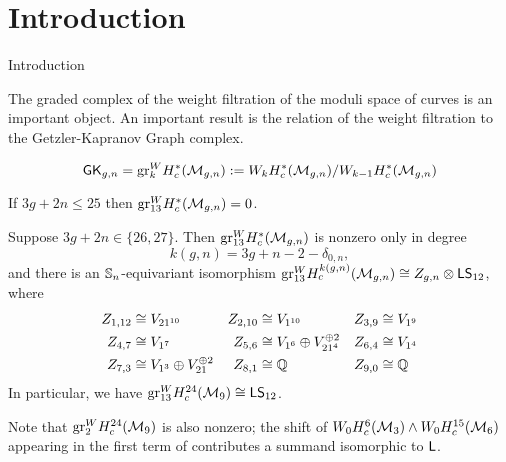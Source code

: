 



\section{Introduction}

Introduction


The graded complex of the weight filtration of the moduli space of curves is an important object. An important result is the relation of the weight filtration to the Getzler-Kapranov Graph complex.

\begin{equation}
    \GK_{g,n} = \gr^W_k H^*_c(\M_{g,n}) := W_k H^*_c(\M_{g,n})/W_{k-1}H^*_c(\M_{g,n})
\end{equation}


\begin{prop}\label{prop:wt 13 vanishing}
    If $3g + 2n \leq 25$ then $\gr_{13}^W H^*_c(\M_{g,n}) = 0$.
\end{prop}

\begin{thm} \label{thm:lowexc13}
    Suppose $3g + 2n \in \{26, 27\}$. Then $\gr_{13}^W H^*_c(\M_{g,n})$ is nonzero only in degree $$k(g,n) = 3g + n - 2 - \delta_{0,n},$$ and there is an $\ss_n$-equivariant isomorphism $\gr_{13}^W H^{k(g,n)}_c(\cM_{g,n}) \cong Z_{g,n} \otimes \lstw$, where
\begin{align*}
    Z_{1,12} & \cong V_{21^{10}} & Z_{2,10} & \cong V_{1^{10}} & Z_{3,9} & \cong V_{1^{9}} \\
    Z_{4,7} & \cong V_{1^{7}} & Z_{5,6} & \cong V_{1^{6}} \oplus V_{21^4}^{\oplus 2} & Z_{6,4} & \cong V_{1^{4}} \\ Z_{7,3} & \cong V_{1^{3}} \oplus V_{21}^{\oplus 2}& Z_{8,1} & \cong \Q & Z_{9,0} & \cong \Q 
\end{align*}
In particular, we have $\gr_{13}^W H^{24}_c(\M_9) \cong \lstw$.
\end{thm}

\noindent  Note that  $\gr_2^W H^{24}_c(\M_9)$ is also nonzero; the shift of $W_0H^6_c(\M_3) \wedge W_0H^{15}_c(\M_6)$ appearing in the first term of  \cite[Theorem~1.2]{PayneWillwacher21} contributes a summand isomorphic to $\l$. 